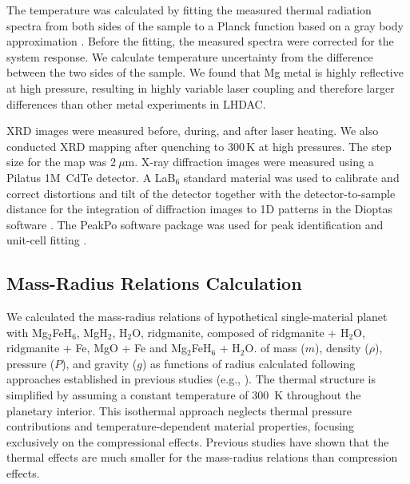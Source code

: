 \documentclass[draft,jgrga,12pt]{agujournal2019}
\begin{document}
The temperature was calculated by fitting the measured thermal radiation spectra from both sides of the sample to a Planck function based on a gray body approximation \cite{prakapenka_advanced_2008}. 
Before the fitting, the measured spectra were corrected for the system response.
We calculate temperature uncertainty from the difference between the two sides of the sample. 
We found that Mg metal is highly reflective at high pressure, resulting in highly variable laser coupling and therefore larger differences than other metal experiments in LHDAC\@.

XRD images were measured before, during, and after laser heating. 
We also conducted XRD mapping after quenching to 300\,K at high pressures. %
The step size for the map was $2~\mu\mathrm{m}$.
X-ray diffraction images were measured using a Pilatus 1M~CdTe detector. 
A LaB$_6$ standard material was used to calibrate and correct distortions and tilt of the detector together with the detector-to-sample distance for the integration of diffraction images to 1D patterns in the Dioptas software \cite{prescher_dioptas_2015}. 
The PeakPo software package was used for peak identification and unit-cell fitting \cite{shim_shdshim_2018}.

\subsection{Mass-Radius Relations Calculation}

We calculated the mass-radius relations of hypothetical single-material planet with Mg$_2$FeH$_6$, MgH$_2$, H$_2$O,  ridgmanite,   composed of ridgmanite + H$_2$O, ridgmanite + Fe, MgO + Fe and Mg$_2$FeH$_6$ + H$_2$O. 
 of mass ($m$), density ($\rho$), pressure ($P$), and gravity ($g$) as functions of radius  calculated following  approaches established in previous studies (e.g., ).
The thermal structure is simplified by assuming a constant temperature of 300~K throughout the planetary interior. 
This isothermal approach neglects thermal pressure contributions and temperature-dependent material properties, focusing exclusively on the compressional effects.
Previous studies \cite{zeng_new_2021, zeng_detailed_2013} have shown that the thermal effects are much smaller for the mass-radius relations than compression effects.
\end{document}
